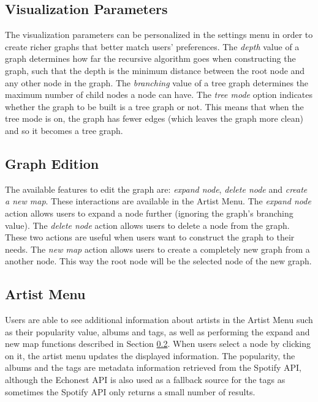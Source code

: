 \documentclass{article}
\begin{document}
    \subsection{Visualization Parameters}
    \label{sub:visualization_parameters}

      The visualization parameters can be personalized in the settings menu in order to create richer graphs that better match users' preferences.
      The \textit{depth} value of a graph determines how far the recursive algorithm goes when constructing the graph, such that the depth is the minimum distance between the root node and any other node in the graph.
      The \textit{branching} value of a tree graph determines the maximum number of child nodes a node can have.
      The \textit{tree mode} option indicates whether the graph to be built is a tree graph or not.
      This means that when the tree mode is on, the graph has fewer edges (which leaves the graph more clean) and so it becomes a tree graph.

    \subsection{Graph Edition}
    \label{sub:graph_edition}
      
      The available features to edit the graph are: \textit{expand node}, \textit{delete node} and \textit{create a new map}. These interactions are available in the Artist Menu.
      The \textit{expand node} action allows users to expand a node further (ignoring the graph's branching value).
      The \textit{delete node} action allows users to delete a node from the graph.
      These two actions are useful when users want to construct the graph to their needs.
      The \emph{new map} action allows users to create a completely new graph from a another node. This way the root node will be the selected node of the new graph.

    \subsection{Artist Menu}
    \label{sub:artist_menu}
    
      Users are able to see additional information about artists in the Artist Menu such as their popularity value, albums and tags, as well as performing the expand and new map functions described in Section \ref{sub:graph_edition}.
      When users select a node by clicking on it, the artist menu updates the displayed information.
      The popularity, the albums and the tags are metadata information retrieved from the Spotify API, although the Echonest API\cite{echonestdev} is also used as a fallback source for the tags  as sometimes the Spotify API only returns a small number of results.
\end{document}
